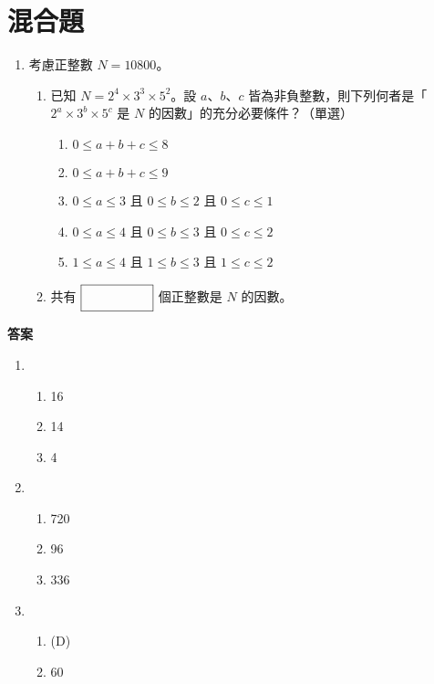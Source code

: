 \documentclass[10pt]{article}
\newcommand*{\blank}[1]{\rule[-.7\baselineskip]{0pt}{1.8\baselineskip}\fbox{\rule[-.4\baselineskip]{0pt}{1.2\baselineskip}\hspace{#1}}}
\begin{document}
\section{混合題}
\begin{enumerate}[label=\arabic*.,align=left,leftmargin=*,labelsep=.3em,start=3]
  \item 考慮正整數 $N = 10800$。
  \begin{enumerate}[label=(\arabic*),align=left,leftmargin=*,labelsep=.3em]
    \item 已知 $N = 2^4 \times 3^3 \times 5^2$。設 $a$、$b$、$c$ 皆為非負整數，則下列何者是「$2^a \times 3^b \times 5^c$ 是 $N$ 的因數」的充分必要條件？（單選）
    \begin{enumerate}[label=(\Alph*),align=left,leftmargin=*,labelsep=.3em]
      \item $0 \leq a + b + c \leq 8$
      \item $0 \leq a + b + c \leq 9$
      \item $0 \leq a \leq 3$ 且 $0 \leq b \leq 2$ 且 $0 \leq c \leq 1$
      \item $0 \leq a \leq 4$ 且 $0 \leq b \leq 3$ 且 $0 \leq c \leq 2$
      \item $1 \leq a \leq 4$ 且 $1 \leq b \leq 3$ 且 $1 \leq c \leq 2$
    \end{enumerate}
    \item 共有 $\blank{5em}$ 個正整數是 $N$ 的因數。
  \end{enumerate}
\end{enumerate}

\newpage
\label{answer}
{\bfseries\large 答案 \par}
\begin{enumerate}[label=\arabic*.,left=0pt]
  \item
  \begin{enumerate}[label=(\arabic*),align=left,leftmargin=*,labelsep=.3em]
    \item 16
    \item 14
    \item 4
  \end{enumerate}
  \item
  \begin{enumerate}[label=(\arabic*),align=left,leftmargin=*,labelsep=.3em]
    \item 720
    \item 96
    \item 336
  \end{enumerate}
  \item
  \begin{enumerate}[label=(\arabic*),align=left,leftmargin=*,labelsep=.3em]
    \item (D)
    \item 60
  \end{enumerate}
\end{enumerate}
\end{document}
